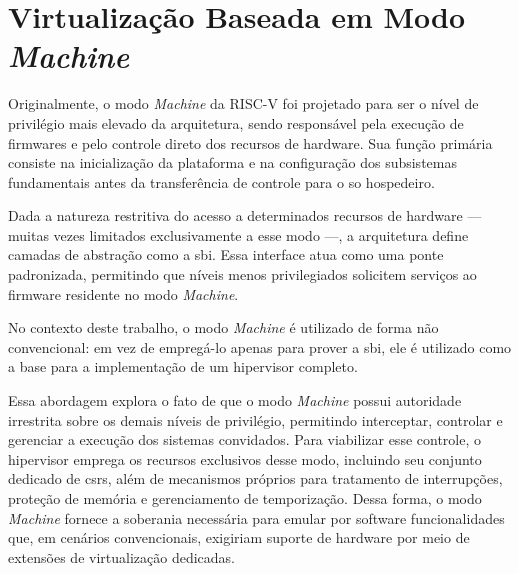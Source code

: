\section{Virtualização Baseada em Modo \textit{Machine}}

Originalmente, o modo \textit{Machine} da RISC-V foi projetado para ser o nível de privilégio mais elevado da arquitetura, sendo responsável pela execução de firmwares
e pelo controle direto dos recursos de hardware. Sua função primária consiste na inicialização da plataforma e na configuração dos subsistemas fundamentais antes da transferência
de controle para o \gls{so} hospedeiro.

Dada a natureza restritiva do acesso a determinados recursos de hardware — muitas vezes limitados exclusivamente a esse modo —, a arquitetura define camadas de
abstração como a \gls{sbi}. Essa interface atua como uma ponte padronizada, permitindo que níveis menos privilegiados solicitem serviços ao firmware residente no modo \textit{Machine}.

No contexto deste trabalho, o modo \textit{Machine} é utilizado de forma não convencional: em vez de empregá-lo apenas para prover a \gls{sbi}, ele é utilizado como a base para a implementação
de um hipervisor completo.

Essa abordagem explora o fato de que o modo \textit{Machine} possui autoridade irrestrita sobre os demais níveis de privilégio, permitindo interceptar, controlar e gerenciar a execução dos
sistemas convidados. Para viabilizar esse controle, o hipervisor emprega os recursos exclusivos desse modo, incluindo seu conjunto dedicado de \glspl{csr}, além de mecanismos próprios para
tratamento de interrupções, proteção de memória e gerenciamento de temporização. Dessa forma, o modo \textit{Machine} fornece a soberania necessária para emular por software funcionalidades
que, em cenários convencionais, exigiriam suporte de hardware por meio de extensões de virtualização dedicadas.

